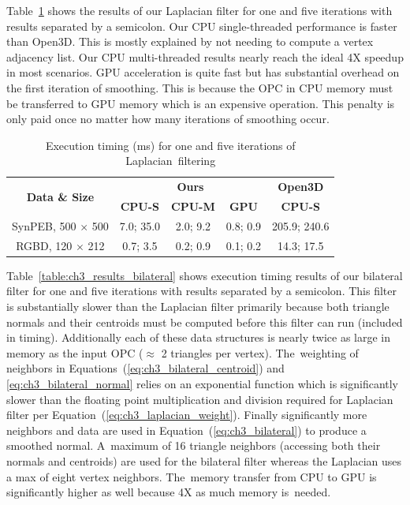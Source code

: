 Table~\ref{table:ch3_results_lapalcian} shows the results of our Laplacian filter for one and five iterations with results separated by a semicolon. Our CPU single-threaded performance is faster than Open3D. This is mostly explained by not needing to compute a vertex adjacency list. Our CPU multi-threaded results nearly reach the ideal 4X speedup in most scenarios. GPU acceleration is quite fast but has substantial overhead on the first iteration of smoothing. This is because the \ac{OPC} in CPU memory must be transferred to GPU memory which is an expensive operation. This penalty is only paid once no matter how many iterations of smoothing occur.  
\begin{table}[H]
\centering
\caption{Execution timing (ms) for one and five iterations of Laplacian~filtering}\label{table:ch3_results_lapalcian}

\begin{tabular}{@{}ccccc@{}}
\toprule
   \multirow{2}{*}{\bf Data \& Size}           & \multicolumn{3}{c}{\textbf{Ours}} & \textbf{Open3D} \\
                  \cmidrule(lr){2-5}     
    & \textbf{CPU-S}     & \textbf{CPU-M}     & \textbf{GPU}         & \textbf{CPU-S}  \\ \midrule
SynPEB, 500 $\times$ 500 & 7.0; 35.0  & 2.0; 9.2   & 0.8; 0.9    & 205.9; 240.6  \\
RGBD, 120 $\times$ 212   & 0.7; 3.5  & 0.2; 0.9   & 0.1; 0.2    & 14.3; 17.5   \\ \bottomrule
\end{tabular}
\end{table}


Table~\ref{table:ch3_results_bilateral} shows execution timing results of our bilateral filter for one and five iterations with results separated by a semicolon. This filter is substantially slower than the Laplacian filter primarily because both triangle normals and their centroids must be computed before this filter can run (included in timing). Additionally each of these data structures is nearly twice as large in memory as the input \ac{OPC} ($\approx$ 2 triangles per vertex). The~weighting of neighbors in Equations~(\ref{eq:ch3_bilateral_centroid}) and \ref{eq:ch3_bilateral_normal} relies on an exponential function which is significantly slower than the floating point multiplication and division required for Laplacian filter per Equation~(\ref{eq:ch3_laplacian_weight}). Finally significantly more neighbors and data are used in Equation~(\ref{eq:ch3_bilateral}) to produce a smoothed normal. A~maximum of 16 triangle neighbors (accessing both their normals and centroids) are used for the bilateral filter whereas the Laplacian uses a max of eight vertex neighbors. The~memory transfer from CPU to GPU is significantly higher as well because 4X as much memory is~needed.

